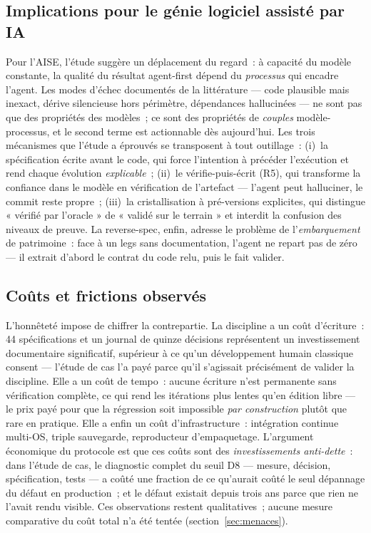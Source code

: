 \subsection{Implications pour le génie logiciel assisté par IA}

Pour l’AISE, l’étude suggère un déplacement du regard~: à capacité du
modèle constante, la qualité du résultat agent-first dépend du
\emph{processus} qui encadre l’agent. Les modes d’échec documentés de la
littérature — code plausible mais inexact, dérive silencieuse hors
périmètre, dépendances hallucinées \cite{hou2024} — ne sont pas que des
propriétés des modèles~; ce sont des propriétés de \emph{couples}
modèle-processus, et le second terme est actionnable dès aujourd’hui. Les
trois mécanismes que l’étude a éprouvés se transposent à tout
outillage~: (i)~la spécification écrite avant le code, qui force
l’intention à précéder l’exécution et rend chaque évolution
\emph{explicable}~; (ii)~le vérifie-puis-écrit (R5), qui transforme la
confiance dans le modèle en vérification de l’artefact — l’agent peut
halluciner, le commit reste propre~; (iii)~la cristallisation à
pré-versions explicites, qui distingue « vérifié par l’oracle » de
« validé sur le terrain » et interdit la confusion des niveaux de preuve.
La reverse-spec, enfin, adresse le problème de l’\emph{embarquement} de
patrimoine~: face à un legs sans documentation, l’agent ne repart pas de
zéro — il extrait d’abord le contrat du code relu, puis le fait valider.

\subsection{Coûts et frictions observés}

L’honnêteté impose de chiffrer la contrepartie. La discipline a un coût
d’écriture~: 44 spécifications et un journal de quinze décisions
représentent un investissement documentaire significatif, supérieur à ce
qu’un développement humain classique consent — l’étude de cas l’a payé
parce qu’il s’agissait précisément de valider la discipline. Elle a un
coût de tempo~: aucune écriture n’est permanente sans vérification
complète, ce qui rend les itérations plus lentes qu’en édition libre — le
prix payé pour que la régression soit impossible \emph{par construction}
plutôt que rare en pratique. Elle a enfin un coût d’infrastructure~:
intégration continue multi-OS, triple sauvegarde, reproducteur
d’empaquetage. L’argument économique du protocole est que ces coûts sont
des \emph{investissements anti-dette}~: dans l’étude de cas, le diagnostic
complet du seuil D8 — mesure, décision, spécification, tests — a coûté une
fraction de ce qu’aurait coûté le seul dépannage du défaut en production~;
et le défaut existait depuis trois ans parce que rien ne l’avait rendu
visible. Ces observations restent qualitatives~; aucune mesure
comparative du coût total n’a été tentée (section~\ref{sec:menaces}).

